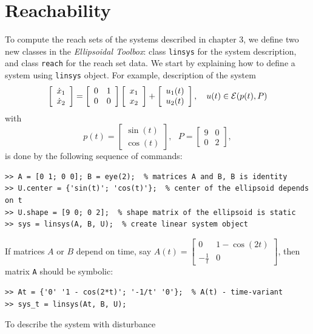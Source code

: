 \documentclass{report}
\newcommand{\EE}{{\cal E}}
\begin{document}
\section{Reachability}
To compute the reach sets of the systems described in chapter 3, we define
two new classes in the {\it Ellipsoidal Toolbox}: class {\tt linsys} for the
system description, and class {\tt reach} for the reach set data.
We start by explaining how to define a system using {\tt linsys} object.
For example, description of the system
\[ \left[\begin{array}{cc}
\dot{x}_1\\
\dot{x}_2\end{array}\right] = \left[\begin{array}{cc}
0 & 1\\
0 & 0\end{array}\right]\left[\begin{array}{c}
x_1\\
x_2\end{array}\right] + \left[\begin{array}{c}
u_1(t)\\
u_2(t)\end{array}\right], ~~~ u(t)\in\EE(p(t), P) \]
with
\[ p(t) = \left[\begin{array}{c}
\sin(t)\\
\cos(t)\end{array}\right], ~~~ P = \left[\begin{array}{cc}
9 & 0\\
0 & 2\end{array}\right], \]
is done by the following sequence of commands:
{\tt \begin{verbatim}
>> A = [0 1; 0 0]; B = eye(2);  % matrices A and B, B is identity
>> U.center = {'sin(t)'; 'cos(t)'};  % center of the ellipsoid depends on t
>> U.shape = [9 0; 0 2];  % shape matrix of the ellipsoid is static
>> sys = linsys(A, B, U);  % create linear system object
\end{verbatim} }
If matrices $A$ or $B$ depend on time, say $A(t)=\left[\begin{array}{cc}
0 & 1-\cos(2t)\\
-\frac{1}{t} & 0\end{array}\right]$, then matrix {\tt A} should be symbolic:
{\tt \begin{verbatim}
>> At = {'0' '1 - cos(2*t)'; '-1/t' '0'};  % A(t) - time-variant
>> sys_t = linsys(At, B, U);
\end{verbatim} }
To describe the system with disturbance
\end{document}
